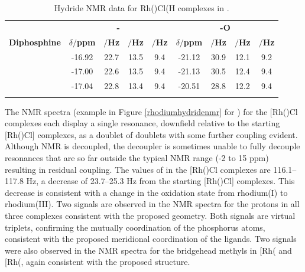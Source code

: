 \begin{table}
\caption[Hydride \proton{} NMR data for [Rh(\tBuxantphosk)Cl(\ce{H)2]}]{Hydride \proton{} NMR data for \texorpdfstring{Rh(\tBuxantphosk)Cl(H\ce{)2]}}R complexes in .}
\vspace{1em}
\label{table:dihydrides}
\small
\begin{center}
\begin{tabular}{c c c c c c c c c}
\toprule{}
	~~ & \multicolumn{4}{c}{\bfseries{\ce{H-} \trans-\ce{Cl-}}} & \multicolumn{4}{c}{\bfseries{\ce{H-} \trans-O}}\\
	\cmidrule(lr){2-5} \cmidrule(lr){6-9} 
	\bfseries{Diphosphine}&\bfseries{$\delta/$ppm}&\bfseries{\JRhH$/$Hz}&\bfseries{\JPH$/$Hz}&\bfseries{\JHH$/$Hz}&\bfseries{$\delta/$ppm}&\bfseries{\JRhH$/$Hz}&\bfseries{\JPH$/$Hz}&\bfseries{\JHH$/$Hz}\\
	\midrule{}
	\tBuSixantphos & -16.92 & 22.7 & 13.5 & 9.4 & -21.12 & 30.9 & 12.1 & 9.2 \\
	\tBuThixantphos & -17.00 & 22.6 & 13.5 & 9.4 & -21.13 & 30.5 & 12.4 & 9.4 \\
	\tBuXantphos & -17.04 & 22.8 & 13.4 & 9.4 & -20.51 & 28.8 & 12.2 & 9.4 \\
	\bottomrule{}
\end{tabular}
\end{center} 
\end{table}

The \phosphorus{} NMR spectra (example in Figure \ref{rhodiumhydridenmr} for \tButhixantphos) for the [Rh(\tBuxantphosk)Cl\ce{(H)2]} complexes each display a single resonance, downfield relative to the starting [Rh(\tBuxantphosk)Cl] complexes, as a doublet of doublets with some further coupling evident.  Although \phosphorus{} NMR is \proton{} decoupled, the decoupler is sometimes unable to fully decouple resonances that are so far outside the typical \proton{} NMR range (-2 to 15 ppm) resulting in residual coupling.  The values of \JRhP{} in the [Rh(\tBuxantphosk)Cl\ce{(H)2]} complexes are 116.1--117.8 Hz, a decrease of 23.7--25.3 Hz from the starting [Rh(\tBuxantphosk)Cl] complexes.  This decrease is consistent with a change in the oxidation state from rhodium(I) to rhodium(III).\cite{Pregosin2012} Two signals are observed in the \proton{} NMR spectra for the \tBu{} protons in all three complexes consistent with the proposed geometry.  Both signals are virtual triplets, confirming the mutually \trans{} coordination of the phosphorus atoms, consistent with the proposed meridional coordination of the ligands.  Two signals were also observed in the \proton{} NMR spectra for the bridgehead methyls in [Rh(\tBuxantphosk\ce{)Cl(H)2]} and [Rh(\tBusixantphosk\ce{)Cl(H)2]}, again consistent with the proposed structure.  

